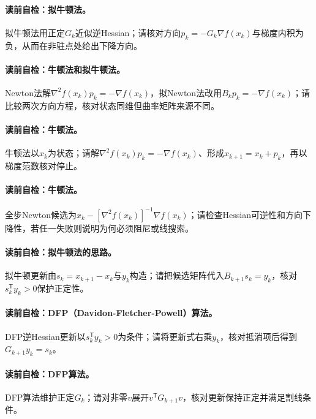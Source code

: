 \paragraph{读前自检：拟牛顿法。}拟牛顿法用正定$G_k$近似逆Hessian；请核对方向$p_k=-G_k\nabla f(x_k)$与梯度内积为负，从而在非驻点处给出下降方向。\par
\paragraph{读前自检：牛顿法和拟牛顿法。}Newton法解$\nabla^2f(x_k)p_k=-\nabla f(x_k)$，拟Newton法改用$B_kp_k=-\nabla f(x_k)$；请比较两次方向方程，核对状态同维但曲率矩阵来源不同。\par
\paragraph{读前自检：牛顿法。}牛顿法以$x_k$为状态；请解$\nabla^2f(x_k)p_k=-\nabla f(x_k)$、形成$x_{k+1}=x_k+p_k$，再以梯度范数核对停止。\par
\paragraph{读前自检：牛顿法。}全步Newton候选为$x_k-[\nabla^2f(x_k)]^{-1}\nabla f(x_k)$；请检查Hessian可逆性和方向下降性，若任一失败则说明为何必须阻尼或线搜索。\par
\paragraph{读前自检：拟牛顿法的思路。}拟牛顿更新由$s_k=x_{k+1}-x_k$与$y_k$构造；请把候选矩阵代入$B_{k+1}s_k=y_k$，核对$s_k^{\mathsf T}y_k>0$保护正定性。\par
\paragraph{读前自检：DFP（Davidon-Fletcher-Powell）算法。}DFP逆Hessian更新以$s_k^{\mathsf T}y_k>0$为条件；请将更新式右乘$y_k$，核对抵消项后得到$G_{k+1}y_k=s_k$。\par
\paragraph{读前自检：DFP算法。}DFP算法维护正定$G_k$；请对非零$v$展开$v^{\mathsf T}G_{k+1}v$，核对更新保持正定并满足割线条件。\par
